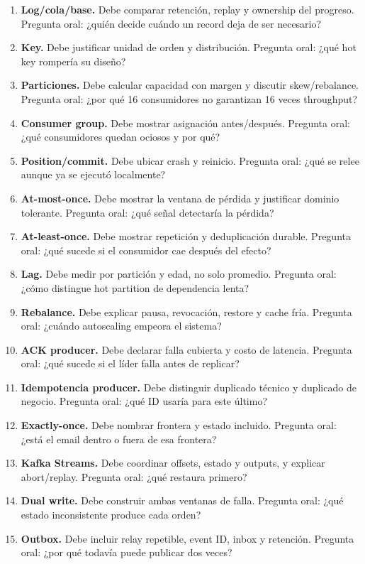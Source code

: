 \documentclass[variant=docente,cover=institutional,mode=screen]{ua-engineering-v6-article}
\begin{document}
\begin{enumerate}
\item \textbf{Log/cola/base.} Debe comparar retención, replay y ownership del progreso. Pregunta oral: ¿quién decide cuándo un record deja de ser necesario?
\item \textbf{Key.} Debe justificar unidad de orden y distribución. Pregunta oral: ¿qué hot key rompería su diseño?
\item \textbf{Particiones.} Debe calcular capacidad con margen y discutir skew/rebalance. Pregunta oral: ¿por qué 16 consumidores no garantizan 16 veces throughput?
\item \textbf{Consumer group.} Debe mostrar asignación antes/después. Pregunta oral: ¿qué consumidores quedan ociosos y por qué?
\item \textbf{Position/commit.} Debe ubicar crash y reinicio. Pregunta oral: ¿qué se relee aunque ya se ejecutó localmente?
\item \textbf{At-most-once.} Debe mostrar la ventana de pérdida y justificar dominio tolerante. Pregunta oral: ¿qué señal detectaría la pérdida?
\item \textbf{At-least-once.} Debe mostrar repetición y deduplicación durable. Pregunta oral: ¿qué sucede si el consumidor cae después del efecto?
\item \textbf{Lag.} Debe medir por partición y edad, no solo promedio. Pregunta oral: ¿cómo distingue hot partition de dependencia lenta?
\item \textbf{Rebalance.} Debe explicar pausa, revocación, restore y cache fría. Pregunta oral: ¿cuándo autoscaling empeora el sistema?
\item \textbf{ACK producer.} Debe declarar falla cubierta y costo de latencia. Pregunta oral: ¿qué sucede si el líder falla antes de replicar?
\item \textbf{Idempotencia producer.} Debe distinguir duplicado técnico y duplicado de negocio. Pregunta oral: ¿qué ID usaría para este último?
\item \textbf{Exactly-once.} Debe nombrar frontera y estado incluido. Pregunta oral: ¿está el email dentro o fuera de esa frontera?
\item \textbf{Kafka Streams.} Debe coordinar offsets, estado y outputs, y explicar abort/replay. Pregunta oral: ¿qué restaura primero?
\item \textbf{Dual write.} Debe construir ambas ventanas de falla. Pregunta oral: ¿qué estado inconsistente produce cada orden?
\item \textbf{Outbox.} Debe incluir relay repetible, event ID, inbox y retención. Pregunta oral: ¿por qué todavía puede publicar dos veces?

\end{enumerate}
\end{document}
